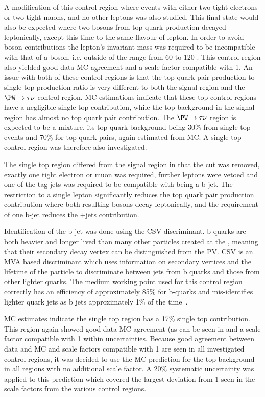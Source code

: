 A modification of this control region where events with either two tight electrons or two tight muons, and no other leptons was also studied. This final state would also be expected where two \PW bosons from top quark production decayed leptonically, except this time to the same flavour of lepton. In order to avoid \PZ boson contributions the lepton's invariant mass was required to be incompatible with that of a \PZ boson, i.e. outside of the range from 60 to 120 \GeV. This control region also yielded good data-\ac{MC} agreement and a scale factor compatible with 1. An issue with both of these control regions is that the top quark pair production to single top production ratio is very different to both the signal region and the $\PW\rightarrow\tau\nu$ control region. \ac{MC} estimations indicate that these top control regions have a negligible single top contribution, while the top background in the signal region has almost no top quark pair contribution. The $\PW\rightarrow\tau\nu$ region is expected to be a mixture, its top quark background being 30\% from single top events and 70\% for top quark pairs, again estimated from \ac{MC}. A single top control region was therefore also investigated.

The single top region differed from the signal region in that the \jetmetdphi cut was removed, exactly one tight electron or muon was required, further leptons were vetoed and one of the tag jets was required to be compatible with being a b-jet. The restriction to a single lepton significantly reduces the top quark pair production contribution where both resulting \PW bosons decay leptonically, and the requirement of one b-jet reduces the \PW+jets contribution. 

Identification of the b-jet was done using the \ac{CSV} discriminant. b quarks are both heavier and longer lived than many other particles created at the \LHC, meaning that their secondary decay vertex can be distinguished from the \ac{PV}. \ac{CSV} is an \ac{MVA} based discriminant which uses information on secondary vertices and the lifetime of the particle to discriminate between jets from b quarks and those from other lighter quarks. The medium working point used for this control region correctly has an efficiency of approximately 85\% for b-quarks and mis-identifies lighter quark jets as b jets approximately 1\% of the time~\cite{bjets}.

\ac{MC} estimates indicate the single top region has a 17\% single top contribution. This region again showed good data-\ac{MC} agreement (as can be seen in  and a scale factor compatible with 1 within uncertainties. Because good agreement between data and \ac{MC} and scale factors compatible with 1 are seen in all investigated control regions, it was decided to use the \ac{MC} prediction for the top background in all regions with no additional scale factor. A 20\% systematic uncertainty was applied to this prediction which covered the largest deviation from 1 seen in the scale factors from the various control regions.

